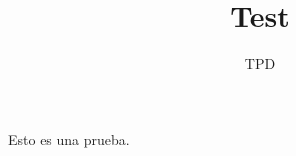 \documentclass[a4paper, 12pt]{article}
\title{Test}
\author{TPD}
\begin{document}
\maketitle
Esto es una prueba.
\end{document}
